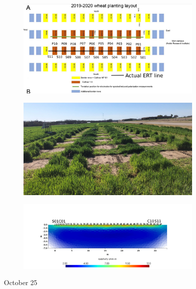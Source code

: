 \documentclass[a4paper,12pt]{article}
\begin{document}
\begin{figure}[H]
\centering
\begin{subfigure}{\textwidth}
\includegraphics[width=\textwidth]{plots.png}
\end{subfigure}
\end{figure}

\begin{figure}[H]
\centering
\begin{subfigure}{\textwidth}
\includegraphics[width=\textwidth]{picture_plots.png}
\end{subfigure}
\end{figure}

\begin{figure}[p]
\centering
\begin{subfigure}{\textwidth}
\includegraphics[width=\textwidth]{October.png}
\end{subfigure}
\caption{October 25}
\end{figure}
\end{document}
